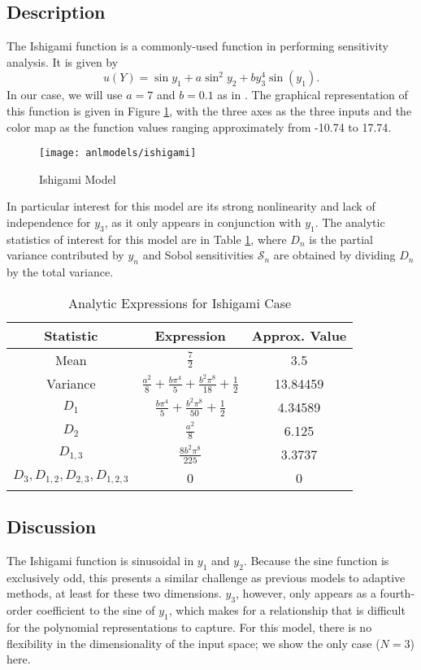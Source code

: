 \subsection{Description}
The Ishigami function \cite{ishigami} is a commonly-used function in performing sensitivity analysis.  It is
given by
\begin{equation}
  u(Y) = \sin{y_1} + a\sin^2{y_2} + b y_3^4\sin(y_1).
\end{equation}
In our case, we will use $a=7$ and $b=0.1$ as in \cite{ishigami2}.
The graphical representation of this function is given in Figure \ref{fig: ishigami}, with the three axes
as the three inputs and the color map as the function values ranging approximately from -10.74 to 17.74.
\begin{figure}[htb]
  \centering
  \texttt{[image: anlmodels/ishigami]}
  \caption{Ishigami Model}
  \label{fig: ishigami}
\end{figure}
In particular interest for this model are
its strong nonlinearity and lack of independence for $y_3$, as it only appears in conjunction with $y_1$.  The
analytic statistics of interest for this model are in Table \ref{tab:ishigami moments}, where $D_n$ is the
partial variance contributed by $y_n$ and Sobol sensitivities $\mathcal{S}_n$ are obtained by dividing $D_n$
by the total variance.

\begin{table}[H]
  \centering
  \begin{tabular}{c|c|c}
  Statistic & Expression & Approx. Value \\\hline
  Mean & $\frac{7}{2}$ & 3.5 \\
  Variance & $\frac{a^2}{8} + \frac{b\pi^4}{5} + \frac{b^2\pi^8}{18} + \frac{1}{2}$ & 13.84459 \\
  $D_1$ & $\frac{b\pi^4}{5} + \frac{b^2\pi^8}{50} + \frac{1}{2} $ &  4.34589 \\
  $D_2$ & $\frac{a^2}{8}$ & 6.125 \\
  $D_{1,3}$ & $\frac{8b^2\pi^8}{225}$ & 3.3737 \\
  $D_3,D_{1,2},D_{2,3},D_{1,2,3}$ & 0 & 0
  \end{tabular}
  \caption{Analytic Expressions for Ishigami Case}
  \label{tab:ishigami moments}
\end{table}


\subsection{Discussion}
The Ishigami function is sinusoidal in $y_1$ and $y_2$.  Because the sine function is exclusively odd, this presents
a similar challenge as previous models to adaptive methods, at least for these two dimensions.  $y_3$, however, only
appears as a fourth-order coefficient to the sine of $y_1$, which makes for a relationship that is difficult for the
polynomial representations to capture.  For this model, there is no flexibility in the dimensionality of the
input space; we show the only case ($N=3$) here.

